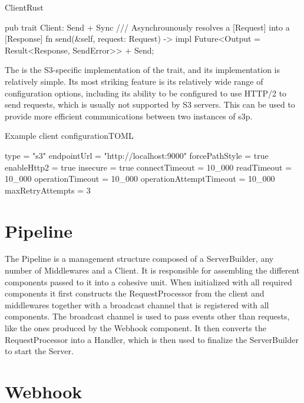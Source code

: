 \begin{codeblock}{Client}{Rust}
	\begin{rustcode}
		pub trait Client: Send + Sync {
			/// Asynchrounously resolves a [Request] into a [Response]
			fn send(&self, request: Request) -> impl Future<Output = Result<Response, SendError>> + Send;
		}
	\end{rustcode}
\end{codeblock}

The  is the S3-specific implementation of the  trait, and its implementation is relatively simple. Its most striking feature is its relatively wide range of configuration options, including its ability to be configured to use HTTP/2 to send requests, which is usually not supported by S3 servers.
This can be used to provide more efficient communications between two instances of s3p.

\begin{codeblock}{Example client configuration}{TOML}
	\begin{javacode}
		[client]
		type = "s3"
		endpointUrl = "http://localhost:9000"
		forcePathStyle = true
		enableHttp2 = true
		insecure = true
		connectTimeout = 10_000
		readTimeout = 10_000
		operationTimeout = 10_000
		operationAttemptTimeout = 10_000
		maxRetryAttempts = 3
	\end{javacode}
\end{codeblock}

\section{Pipeline}

The Pipeline is a management structure composed of a ServerBuilder, any number of Middlewares and a Client. It is responsible for assembling the different components passed to it into a cohesive unit. When initialized with all required components it first constructs the RequestProcessor from the client and middlewares together with a broadcast channel that is registered with all components. The broadcast channel is used to pass events other than requests, like the ones produced by the Webhook component. It then converts the RequestProcessor into a Handler, which is then used to finalize the ServerBuilder to start the Server.

\section{Webhook}

